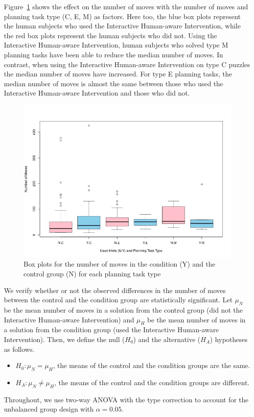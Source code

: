 Figure~\ref{fig:lenbytype} shows the effect on the number of moves with the number of moves and planning task type (C, E, M) as factors.
Here too, the blue box plots represent the human subjects who used the Interactive Human-aware Intervention, while the red box plots represent the human subjects who did not.
Using the Interactive Human-aware Intervention, human subjects who solved type M planning tasks have been able to reduce the median number of moves.
In contrast, when using the Interactive Human-aware Intervention on type C puzzles the median number of moves have increased.
For type E planning tasks, the median number of moves is almost the same between those who used the Interactive Human-aware Intervention and those who did not.

\begin{figure}[tpb]
  \centering
\includegraphics[width=0.8\columnwidth]{img/lenbytype.png}
  \caption{Box plots for the number of moves in the condition (Y) and the control group (N) for each planning task type}
  \label{fig:lenbytype}
\end{figure}

We verify whether or not the observed differences in the number of moves between the control and the condition group are statistically significant.
Let $\mu_N$ be the mean number of moves in a solution from the control group (did not the Interactive Human-aware Intervention) and $\mu_H$ be the mean number of moves in a solution from the condition group (used the Interactive Human-aware Intervention).
Then, we define the null ($H_0$) and the alternative ($H_A$) hypotheses as follows.
\begin{itemize}
\item $H_0: \mu_N = \mu_H$, the means of the control and the condition groups are the same.
\item $H_A: \mu_N \neq \mu_H$, the means of the control and the condition groups are different.
\end{itemize}
Throughout, we use two-way ANOVA with the type  correction to account for the unbalanced group design with $\alpha=0.05$.

